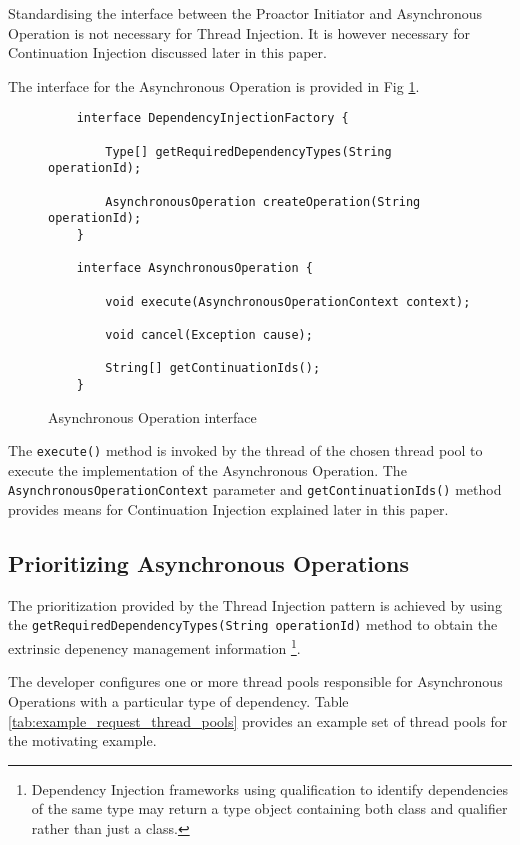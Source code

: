 \documentclass{article}
\begin{document}
Standardising the interface between the Proactor Initiator and Asynchronous
Operation is not necessary for Thread Injection.  It is however necessary for
Continuation Injection discussed later in this paper.

The interface for the Asynchronous Operation is provided in Fig
\ref{fig:AO_interface_AOP}.

\begin{figure}[!h]
\begin{verbatim}
    interface DependencyInjectionFactory {
    
        Type[] getRequiredDependencyTypes(String operationId);
        
        AsynchronousOperation createOperation(String operationId);
    }

    interface AsynchronousOperation {
    
        void execute(AsynchronousOperationContext context);
        
        void cancel(Exception cause);
        
        String[] getContinuationIds();
    }
\end{verbatim}
\caption[Caption for Code]{Asynchronous Operation interface}
\label{fig:AO_interface_AOP}
\end{figure}

The \texttt{execute()} method is invoked by the thread of the chosen thread pool
to execute the implementation of the Asynchronous Operation.  The
\texttt{AsynchronousOperationContext} parameter and \texttt{getContinuationIds()}
method provides means for Continuation Injection explained later in this paper.


\subsection{Prioritizing Asynchronous Operations}

The prioritization provided by the Thread Injection pattern is achieved by using
the \texttt{getRequiredDependencyTypes(String operationId)} method to obtain the
extrinsic depenency management information \footnote{Dependency Injection
frameworks using qualification to identify dependencies of the same type may
return a type object containing both class and qualifier rather than just a
class.}.

The developer configures one or more thread pools responsible for Asynchronous
Operations with a particular type of dependency. Table
\ref{tab:example_request_thread_pools} provides an example set of thread pools
for the motivating example.
\end{document}
